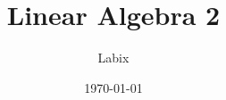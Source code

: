 \documentclass[a4paper]{article}
\title{Linear Algebra 2}
\author{Labix}
\date{\today}
\begin{document}
\maketitle
\begin{abstract}
\end{abstract}
\pagebreak
\tableofcontents
\pagebreak

\end{document}
